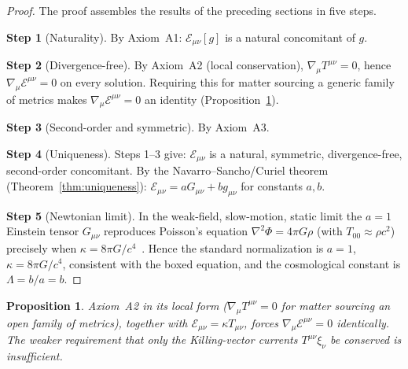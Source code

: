 \documentclass[12pt]{article}
\theoremstyle{plain}
\newtheorem{proposition}[theorem]{Proposition}
\theoremstyle{definition}
\theoremstyle{remark}
\begin{document}
\begin{proof}
The proof assembles the results of the preceding sections in five steps.

\textbf{Step 1} (Naturality). By Axiom~A1: $\mathcal{E}_{\mu\nu}[g]$ is a natural concomitant of $g$.

\textbf{Step 2} (Divergence-free). By Axiom~A2 (local conservation), $\nabla_\mu T^{\mu\nu} = 0$, hence $\nabla_\mu\mathcal{E}^{\mu\nu} = 0$ on every solution. Requiring this for matter sourcing a generic family of metrics makes $\nabla_\mu\mathcal{E}^{\mu\nu} = 0$ an identity (Proposition~\ref{prop:div-free-from-A2}).

\textbf{Step 3} (Second-order and symmetric). By Axiom~A3.

\textbf{Step 4} (Uniqueness). Steps 1--3 give: $\mathcal{E}_{\mu\nu}$ is a natural, symmetric, divergence-free, second-order concomitant. By the Navarro--Sancho/Curiel theorem (Theorem~\ref{thm:uniqueness}):
$\mathcal{E}_{\mu\nu} = aG_{\mu\nu} + bg_{\mu\nu}$ for constants $a, b$.

\textbf{Step 5} (Newtonian limit). In the weak-field, slow-motion, static limit the $a=1$ Einstein tensor $G_{\mu\nu}$ reproduces Poisson's equation $\nabla^2\Phi = 4\pi G\rho$ (with $T_{00}\approx\rho c^2$) precisely when $\kappa = 8\pi G/c^4$~\cite{wald1984}. Hence the standard normalization is $a = 1$, $\kappa = 8\pi G/c^4$, consistent with the boxed equation, and the cosmological constant is $\Lambda = b/a = b$.
\end{proof}

\begin{proposition}\label{prop:div-free-from-A2}
Axiom~A2 in its local form ($\nabla_\mu T^{\mu\nu} = 0$ for matter sourcing an open family of metrics), together with $\mathcal{E}_{\mu\nu} = \kappa T_{\mu\nu}$, forces $\nabla_\mu\mathcal{E}^{\mu\nu} = 0$ identically. The weaker requirement that only the Killing-vector currents $T^{\mu\nu}\xi_\nu$ be conserved is \emph{insufficient}.
\end{proposition}
\end{document}
